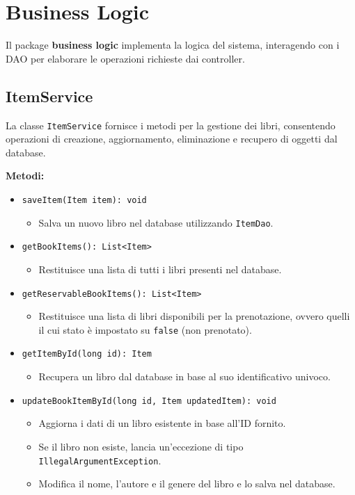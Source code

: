 \documentclass[twoside,openright,titlepage,fleqn,headinclude,12pt,a4paper,BCOR=5mm,footinclude]{scrbook}
\begin{document}
\section{Business Logic}

Il package \textbf{business logic} implementa la logica del sistema, interagendo con i DAO per elaborare le operazioni richieste dai controller.  


\subsection{ItemService}
La classe \texttt{ItemService} fornisce i metodi per la gestione dei libri, consentendo operazioni di creazione, aggiornamento, eliminazione e recupero di oggetti dal database.

\textbf{Metodi:}  
\begin{itemize}  
    \item \texttt{saveItem(Item item): void}  
    \begin{itemize}  
        \item Salva un nuovo libro nel database utilizzando \texttt{ItemDao}.  
    \end{itemize}  

    \item \texttt{getBookItems(): List<Item>}  
    \begin{itemize}  
        \item Restituisce una lista di tutti i libri presenti nel database.  
    \end{itemize}  

    \item \texttt{getReservableBookItems(): List<Item>}  
    \begin{itemize}  
        \item Restituisce una lista di libri disponibili per la prenotazione, ovvero quelli il cui stato è impostato su \texttt{false} (non prenotato).  
    \end{itemize}  

    \item \texttt{getItemById(long id): Item}  
    \begin{itemize}  
        \item Recupera un libro dal database in base al suo identificativo univoco.  
    \end{itemize}  

    \item \texttt{updateBookItemById(long id, Item updatedItem): void}  
    \begin{itemize}  
        \item Aggiorna i dati di un libro esistente in base all'ID fornito.  
        \item Se il libro non esiste, lancia un'eccezione di tipo \texttt{IllegalArgumentException}.  
        \item Modifica il nome, l'autore e il genere del libro e lo salva nel database.  
    \end{itemize}  


\end{itemize}
\end{document}
